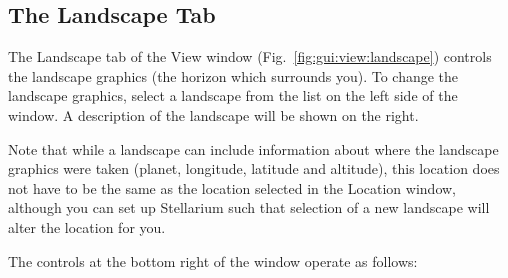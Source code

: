 \subsection{The Landscape Tab}
\label{sec:gui:view:landscape}

The Landscape tab of the View window
(Fig.~\ref{fig:gui:view:landscape}) controls the landscape graphics
(the horizon which surrounds you). To change the landscape graphics,
select a landscape from the list on the left side of the window. A
description of the landscape will be shown on the right.

Note that while a landscape  can include information about where the
landscape graphics were taken (planet, longitude, latitude and
altitude), this location does not have to be the same as the location
selected in the Location window, although you can set up Stellarium such
that selection of a new landscape will alter the location for you.

The controls at the bottom right of the window operate as follows:

